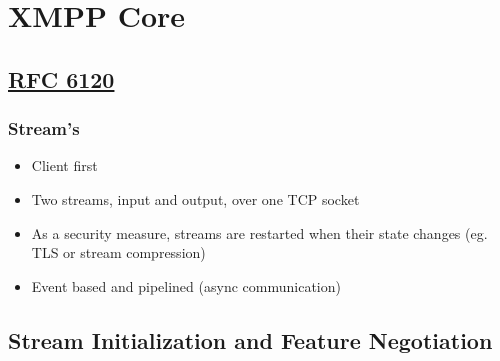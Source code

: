 \documentclass[xelatex,aspectratio=169]{beamer}
\begin{document}
\section[]{XMPP Core}
\subsection[]{\href{https://tools.ietf.org/html/rfc6120}{RFC 6120}}
\frame{\sectionpage\subsectionpage}

\begin{frame}
	\frametitle{Stream's}
	\begin{itemize}
		\item Client first
		\item Two streams, input and output, over one TCP socket
		\item As a security measure, streams are restarted when their state changes
			(eg. TLS or stream compression)
		\item Event based and pipelined (async communication)
	\end{itemize}
\end{frame}

\subsection[]{Stream Initialization and Feature Negotiation}
\frame{\subsectionpage}
\end{document}

